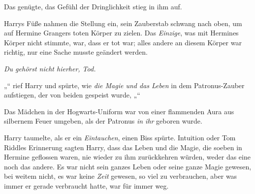 Das genügte, das Gefühl der Dringlichkeit stieg in ihm auf.

Harrys Füße nahmen die Stellung ein, sein Zauberstab schwang nach oben, um auf Hermine Grangers toten Körper zu zielen. Das \emph{Einzige}, was mit Hermines Körper nicht stimmte, war, dass er tot war; alles andere an diesem Körper war richtig, nur eine Sache musste geändert werden.

\emph{Du gehörst nicht hierher, Tod.}

„“ rief Harry und spürte, wie \emph{die Magie und das Leben} in dem Patronus-Zauber aufstiegen, der von beiden gespeist wurde, „“

Das Mädchen in der Hogwarts-Uniform war von einer flammenden Aura aus silbernem Feuer umgeben, als der Patronus \emph{in ihr} geboren wurde.

Harry taumelte, als er ein \emph{Eintauchen}, einen Biss spürte. Intuition oder Tom Riddles Erinnerung sagten Harry, dass das Leben und die Magie, die soeben in Hermine geflossen waren, nie wieder zu ihm zurückkehren würden, weder das eine noch das andere. Es war nicht sein ganzes Leben oder seine ganze Magie gewesen, bei weitem nicht, es war keine \emph{Zeit} gewesen, so viel zu verbrauchen, aber was immer er gerade verbraucht hatte, war für immer weg.

